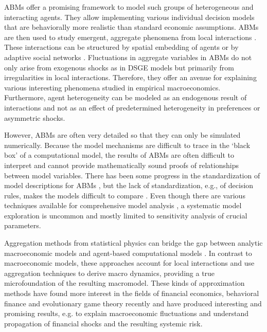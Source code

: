 ABMs offer a promising framework to model such groups of heterogeneous and interacting agents.
They allow implementing various individual decision models that are behaviorally more realistic than standard economic assumptions. ABMs are then used to study emergent, aggregate phenomena from local interactions \citep{Epstein1999, Tesfatsion2006, Hamill2016}.
These interactions can be structured by spatial embedding of agents or by adaptive social networks \citep{Gross2008,Holme2006a}.
Fluctuations in aggregate variables in ABMs do not only arise from exogenous shocks as in DSGE models but primarily from irregularities in local interactions. Therefore, they offer an avenue for explaining various interesting phenomena studied in empirical macroeconomics.
Furthermore, agent heterogeneity can be modeled as an endogenous result of interactions and not as an effect of predetermined heterogeneity in preferences or asymmetric shocks.

However, ABMs are often very detailed so that they can only be simulated numerically. Because the model mechanisms are difficult to trace in the `black box' of a computational model, the results of ABMs are often difficult to interpret and cannot provide mathematically sound proofs of relationships between model variables. There has been some progress in the standardization of model descriptions for ABMs \citep{Grimm2006}, but the lack of standardization, e.g., of decision rules, makes the models difficult to compare \citep[][p. 239]{Hamill2016}. Even though there are various techniques available for comprehensive model analysis \citep{Lee2015}, a systematic model exploration is uncommon and mostly limited to sensitivity analysis of crucial parameters.

Aggregation methods from statistical physics can bridge the gap between analytic macroeconomic models and agent-based computational models \citep[for a review of physics methods in social modeling, see ref.][]{castellano2009statistical}. In contrast to macroeconomic models, these approaches account for local interactions and use aggregation techniques to derive macro dynamics, providing a true microfoundation of the resulting macromodel.
These kinds of approximation methods have found more interest in the fields of financial economics, behavioral finance and evolutionary game theory recently and have produced interesting and promising results, e.g. to explain macroeconomic fluctuations and understand propagation of financial shocks and the resulting systemic risk.

